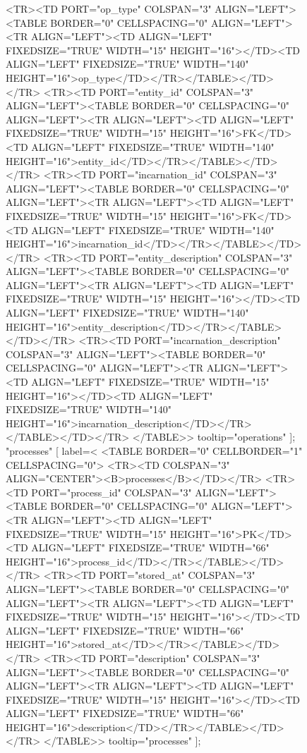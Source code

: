 \begin{figure}[t]
{      <TR><TD PORT="op_type" COLSPAN="3" ALIGN="LEFT"><TABLE BORDER="0" CELLSPACING="0" ALIGN="LEFT"><TR ALIGN="LEFT"><TD ALIGN="LEFT" FIXEDSIZE="TRUE" WIDTH="15" HEIGHT="16"></TD><TD ALIGN="LEFT" FIXEDSIZE="TRUE" WIDTH="140" HEIGHT="16">op_type</TD></TR></TABLE></TD></TR>
      <TR><TD PORT="entity_id" COLSPAN="3" ALIGN="LEFT"><TABLE BORDER="0" CELLSPACING="0" ALIGN="LEFT"><TR ALIGN="LEFT"><TD ALIGN="LEFT" FIXEDSIZE="TRUE" WIDTH="15" HEIGHT="16">FK</TD><TD ALIGN="LEFT" FIXEDSIZE="TRUE" WIDTH="140" HEIGHT="16">entity_id</TD></TR></TABLE></TD></TR>
      <TR><TD PORT="incarnation_id" COLSPAN="3" ALIGN="LEFT"><TABLE BORDER="0" CELLSPACING="0" ALIGN="LEFT"><TR ALIGN="LEFT"><TD ALIGN="LEFT" FIXEDSIZE="TRUE" WIDTH="15" HEIGHT="16">FK</TD><TD ALIGN="LEFT" FIXEDSIZE="TRUE" WIDTH="140" HEIGHT="16">incarnation_id</TD></TR></TABLE></TD></TR>
      <TR><TD PORT="entity_description" COLSPAN="3" ALIGN="LEFT"><TABLE BORDER="0" CELLSPACING="0" ALIGN="LEFT"><TR ALIGN="LEFT"><TD ALIGN="LEFT" FIXEDSIZE="TRUE" WIDTH="15" HEIGHT="16"></TD><TD ALIGN="LEFT" FIXEDSIZE="TRUE" WIDTH="140" HEIGHT="16">entity_description</TD></TR></TABLE></TD></TR>
      <TR><TD PORT="incarnation_description" COLSPAN="3" ALIGN="LEFT"><TABLE BORDER="0" CELLSPACING="0" ALIGN="LEFT"><TR ALIGN="LEFT"><TD ALIGN="LEFT" FIXEDSIZE="TRUE" WIDTH="15" HEIGHT="16"></TD><TD ALIGN="LEFT" FIXEDSIZE="TRUE" WIDTH="140" HEIGHT="16">incarnation_description</TD></TR></TABLE></TD></TR>
    </TABLE>>
    tooltip="operations"
  ];
  "processes" [
   label=<
    <TABLE BORDER="0" CELLBORDER="1" CELLSPACING="0">
      <TR><TD COLSPAN="3" ALIGN="CENTER"><B>processes</B></TD></TR>
      <TR><TD PORT="process_id" COLSPAN="3" ALIGN="LEFT"><TABLE BORDER="0" CELLSPACING="0" ALIGN="LEFT"><TR ALIGN="LEFT"><TD ALIGN="LEFT" FIXEDSIZE="TRUE" WIDTH="15" HEIGHT="16">PK</TD><TD ALIGN="LEFT" FIXEDSIZE="TRUE" WIDTH="66" HEIGHT="16">process_id</TD></TR></TABLE></TD></TR>
      <TR><TD PORT="stored_at" COLSPAN="3" ALIGN="LEFT"><TABLE BORDER="0" CELLSPACING="0" ALIGN="LEFT"><TR ALIGN="LEFT"><TD ALIGN="LEFT" FIXEDSIZE="TRUE" WIDTH="15" HEIGHT="16"></TD><TD ALIGN="LEFT" FIXEDSIZE="TRUE" WIDTH="66" HEIGHT="16">stored_at</TD></TR></TABLE></TD></TR>
      <TR><TD PORT="description" COLSPAN="3" ALIGN="LEFT"><TABLE BORDER="0" CELLSPACING="0" ALIGN="LEFT"><TR ALIGN="LEFT"><TD ALIGN="LEFT" FIXEDSIZE="TRUE" WIDTH="15" HEIGHT="16"></TD><TD ALIGN="LEFT" FIXEDSIZE="TRUE" WIDTH="66" HEIGHT="16">description</TD></TR></TABLE></TD></TR>
    </TABLE>>
    tooltip="processes"
  ];
  
}
\end{figure}
